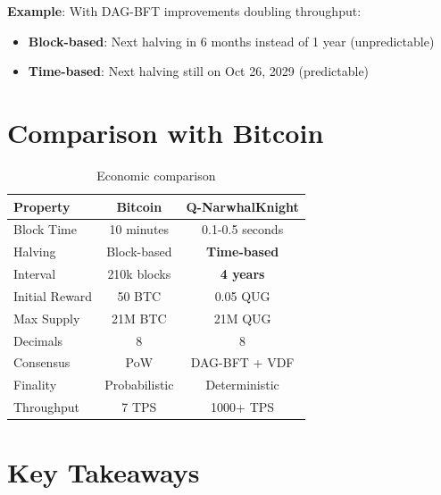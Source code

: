 \documentclass[11pt,a4paper]{article}
\begin{document}
\textbf{Example}: With DAG-BFT improvements doubling throughput:
\begin{itemize}
    \item \textbf{Block-based}: Next halving in 6 months instead of 1 year (unpredictable)
    \item \textbf{Time-based}: Next halving still on Oct 26, 2029 (predictable)
\end{itemize}

\section{Comparison with Bitcoin}

\begin{table}[h]
\centering
\small
\begin{tabular}{lcc}
\toprule
\textbf{Property} & \textbf{Bitcoin} & \textbf{Q-NarwhalKnight} \\
\midrule
Block Time & 10 minutes & 0.1-0.5 seconds \\
Halving & Block-based & \textbf{Time-based} \\
Interval & 210k blocks & \textbf{4 years} \\
Initial Reward & 50 BTC & 0.05 QUG \\
Max Supply & 21M BTC & 21M QUG \\
Decimals & 8 & 8 \\
Consensus & PoW & DAG-BFT + VDF \\
Finality & Probabilistic & Deterministic \\
Throughput & 7 TPS & 1000+ TPS \\
\bottomrule
\end{tabular}
\caption{Economic comparison}
\end{table}

\section{Key Takeaways}
\end{document}
